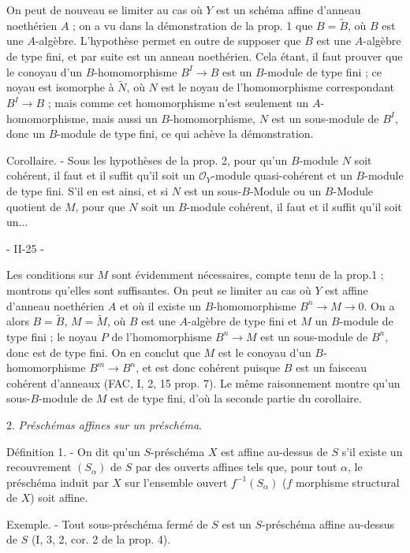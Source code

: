 On peut de nouveau se limiter au cas où $Y$ est un schéma affine d'anneau noethérien $A$ ; on a vu dans la démonstration de la prop. 1 que $B = \tilde{B}$, où $B$ est une $A$-algèbre. L'hypothèse permet en outre de supposer que $B$ est une $A$-algèbre de type fini, et par suite est un anneau noethérien. Cela étant, il faut prouver que le conoyau d'un $B$-homomorphisme $B^I \to B$ est un $B$-module de type fini ; ce noyau est isomorphe à $\tilde{N}$, où $N$ est le noyau de l'homomorphisme correspondant $B^I \to B$ ; mais comme cet homomorphisme n'est seulement un $A$-homomorphisme, mais aussi un $B$-homomorphisme, $N$ est un sous-module de $B^I$, donc un $B$-module de type fini, ce qui achève la démonstration.

Corollaire. - Sous les hypothèses de la prop. 2, pour qu'un $B$-module $N$ soit cohérent, il faut et il suffit qu'il soit un $\mathcal{O}_Y$-module quasi-cohérent et un $B$-module de type fini. S'il en est ainsi, et si $N$ est un sous-$B$-Module ou un $B$-Module quotient de $M$, pour que $N$ soit un $B$-module cohérent, il faut et il suffit qu'il soit un...

\newpage


- II-25 -

Les conditions sur $M$ sont évidemment nécessaires, compte tenu de la prop.1 ; montrons qu'elles sont suffisantes. On peut se limiter au cas où $Y$ est affine d'anneau noethérien $A$ et où il existe un $B$-homomorphisme $B^n \to M \to 0$. On a alors $B = \tilde{B}$, $M = \tilde{M}$, où $B$ est une $A$-algèbre de type fini et $M$ un $B$-module de type fini ; le noyau $P$ de l'homomorphisme $B^n \to M$ est un sous-module de $B^n$, donc est de type fini. On en conclut que $M$ est le conoyau d'un $B$-homomorphisme $B^m \to B^n$, et est donc cohérent puisque $B$ est un faisceau cohérent d'anneaux (FAC, I, 2, 15 prop. 7). Le même raisonnement montre qu'un sous-$B$-module de $M$ est de type fini, d'où la seconde partie du corollaire.

2. \emph{Préschémas affines sur un préschéma}.

Définition 1. - On dit qu'un $S$-préschéma $X$ est affine au-dessus de $S$ s'il existe un recouvrement $(S_\alpha)$ de $S$ par des ouverts affines tels que, pour tout $\alpha$, le préschéma induit par $X$ sur l'ensemble ouvert $f^{-1}(S_\alpha)$ ($f$ morphisme structural de $X$) soit affine.

Exemple. - Tout sous-préschéma fermé de $S$ est un $S$-préschéma affine au-dessus de $S$ (I, 3, 2, cor. 2 de la prop. 4).

